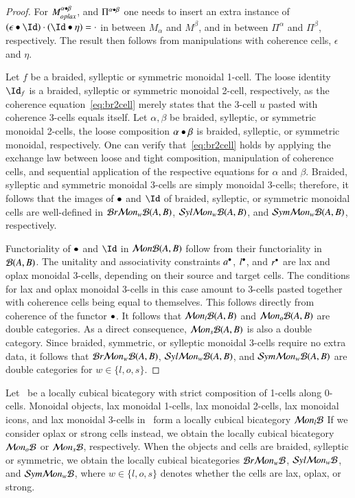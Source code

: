 \begin{proof}
 For $M_{oplax}^{\alpha \bullet \beta}$, and $\Pi^{\alpha \bullet \beta}$ one needs to insert an extra instance of $(\epsilon \horc \looseid) \verc (\looseid \horc \eta) = \verc$ in between $M_{\alpha}$ and $M^{\beta}$, and in between $\Pi^{\alpha}$ and $\Pi^{\beta}$, respectively. The result then follows from manipulations with coherence cells, $\epsilon$ and $\eta$.

Let $f$ be a braided, sylleptic or symmetric monoidal 1-cell. The loose identity $\looseid_f$ is a braided, sylleptic or symmetric monoidal 2-cell, respectively, as the coherence equation~\ref{eq:br2cell} merely states that the 3-cell $u$ pasted with coherence 3-cells equals itself. Let $\alpha, \beta$ be braided, sylleptic, or symmetric monoidal 2-cells, the loose composition $\alpha \bullet \beta$ is braided, sylleptic, or symmetric monoidal, respectively. One can verify that~\ref{eq:br2cell} holds by applying the exchange law between loose and tight composition, manipulation of coherence cells, and sequential application of the respective equations for $\alpha$ and $\beta$.  Braided, sylleptic and symmetric monoidal 3-cells are simply monoidal 3-cells; therefore, it follows that the images of $\bullet$ and $\looseid$ of braided, sylleptic, or symmetric monoidal cells are well-defined in $\mathcal{B} r \mathcal{M} on_w\mathcal{B}(A,B)$, $\mathcal{S} yl \mathcal{M} on_w\mathcal{B}(A,B)$, and $\mathcal{S} ym \mathcal{M} on_w\mathcal{B}(A,B)$, respectively.

Functoriality of $\bullet$ and $\looseid$ in $\mathcal{M} on \mathcal{B}(A,B)$ follow from their functoriality in $\mathcal{B}(A,B)$. 
The unitality and associativity constraints $a^{\bullet}$, $l^{\bullet}$, and $r^{\bullet}$ are lax and oplax monoidal 3-cells, depending on their source and target cells. The conditions for lax and oplax monoidal 3-cells in this case amount to 3-cells pasted together with coherence cells being equal to themselves. This follows directly from coherence of the functor $\bullet$. It follows that $\mathcal{M} on_l\mathcal{B}(A,B)$ and $\mathcal{M} on_o\mathcal{B}(A,B)$ are double categories. As a direct consequence, $\mathcal{M} on_s\mathcal{B}(A,B)$ is also a double category.
Since braided, symmetric, or sylleptic monoidal 3-cells require no extra data, it follows that $\mathcal{B} r \mathcal{M} on_w\mathcal{B}(A,B)$, $\mathcal{S} yl \mathcal{M} on_w\mathcal{B}(A,B)$, and $\mathcal{S} ym \mathcal{M} on_w\mathcal{B}(A,B)$ are double categories for $w \in \{l,o,s\}$.
\end{proof}

\begin{thm}\label{thm:lcbc}
Let \fB\ be a locally cubical bicategory with strict composition of 1-cells along 0-cells. Monoidal objects, lax monoidal 1-cells, lax monoidal 2-cells, lax monoidal icons, and lax monoidal 3-cells in  \fB\ form a locally cubical bicategory $\mathcal{M} on_l\mathcal{B}$ 
  If we consider oplax or strong cells instead, we obtain the locally cubical bicategory $\mathcal{M} on_o\mathcal{B}$ or $\mathcal{M} on_s\mathcal{B}$, respectively. When the objects and cells are braided, sylleptic or symmetric,  we obtain the locally cubical bicategories $\mathcal{B} r \mathcal{M} on_w\mathcal{B}$, $\mathcal{S} yl \mathcal{M} on_w\mathcal{B}$, and $\mathcal{S} ym \mathcal{M} on_w\mathcal{B}$, where $w \in \{l,o,s\}$ denotes whether the cells are lax, oplax, or strong.
\end{thm}

